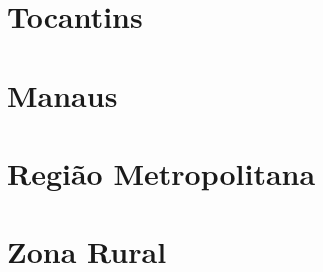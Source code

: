 \documentclass[8pt]{beamer}
\begin{document}
\section{Tocantins}


\begin{frame}[label=amztocod2dig]{}
\textit{\hyperlink{indice_principal}{}}

\end{frame}

\begin{frame}[label=amztocnae2dig]{}
\textit{\hyperlink{indice_principal}{}}

\end{frame}

\section{Manaus}


\begin{frame}[label=amzmanauscod2dig]{}
\textit{\hyperlink{indice_principal}{}}

\end{frame}

\begin{frame}[label=amzmanauscnae2dig]{}
\textit{\hyperlink{indice_principal}{}}

\end{frame}

\section{Região Metropolitana}


\begin{frame}[label=amzmetropolitanacod2dig]{}
\textit{\hyperlink{indice_principal}{}}

\end{frame}

\begin{frame}[label=amzmetropolitanacnae2dig]{}
\textit{\hyperlink{indice_principal}{}}

\end{frame}

\section{Zona Rural}


\begin{frame}[label=amzruralcod2dig]{}
\textit{\hyperlink{indice_principal}{}}

\end{frame}
\end{document}

